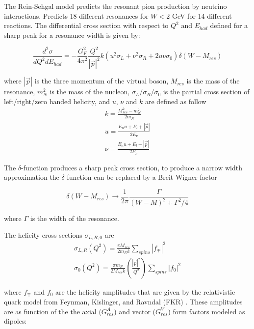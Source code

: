 The Rein-Sehgal model \cite{REIN198179} predicts the resonant pion production by neutrino interactions. Predicts 18 different resonances for $W<2$ GeV for 14 different reactions. The differential cross section with respect to $Q^2$ and $E_{had}$ defined for a sharp peak for a resonance width is given by:

\begin{equation}
    \frac{d^2\sigma}{dQ^2dE_{had}}=-\frac{G^2_F}{4\pi^2}\frac{Q^2}{|\Vec{p}|^2} k (u^2\sigma_L + \nu^2\sigma_R + 2u\nu\sigma_0)\delta(W-M_{res})
\end{equation}

where $|\Vec{p}|$ is the three momentum of the virtual boson, $M_{res}$ is the mass of the resonance, $m^2_N$ is the mass of the nucleon, $\sigma_L$/$\sigma_R$/$\sigma_0$ is the partial cross section of left/right/zero handed helicity, and $u$, $\nu$ and $k$ are defined as follow
\begin{equation}
    \begin{split}
        k = \frac{M^2_{res}-m^2_N}{2m_N}\\
        u = \frac{E_nu + E_l + |\Vec{p}|}{2E_\nu}\\
        \nu = \frac{E_nu + E_l - |\Vec{p}|}{2E_\nu}
    \end{split}
\end{equation}

The $\delta$-function produces a sharp peak cross section, to produce a narrow width approximation the $\delta$-function can be replaced by a Breit-Wigner factor

\begin{equation}
    \delta(W-M_{res})\rightarrow\frac{1}{2\pi}\frac{\Gamma}{(W-M)^2+\Gamma^2/4}
\end{equation}

where $\Gamma$ is the width of the resonance.

The helicity cross sections $\sigma_{L,R,0}$ are 
\begin{equation}
    \begin{split}
        \sigma_{L,R}(Q^2) = \frac{\pi M_{res}}{2m_N k}\sum_{spins}|f_\mp|^2\\
        \sigma_{0}(Q^2) = \frac{\pi m_N }{2 M_{res} k}\left(\frac{|\Vec{p}|^2}{Q^2}\right)\sum_{spins}|f_0|^2
    \end{split}
\end{equation}

where $f_\mp$ and $f_0$ are the helicity amplitudes that are given by the relativistic quark model from Feynman, Kislinger, and Ravndal (FKR) \cite{PhysRevD.3.2706}. These amplitudes are as function of the the axial ($G^A_{res}$) and vector ($G^V_{res}$) form factors modeled as dipoles:

